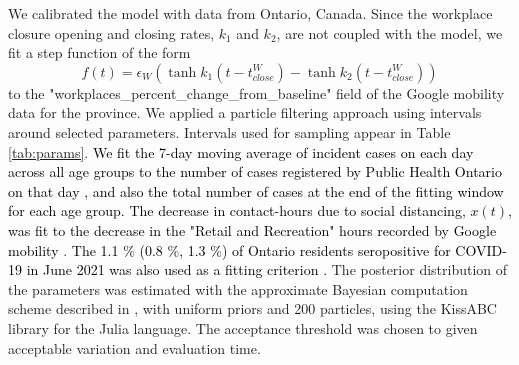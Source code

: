 We calibrated the model with data from Ontario, Canada. Since the workplace closure opening and closing rates, $k_1$ and $k_2$, are not coupled with the model, we fit a step function of the form $$f(t) = \epsilon_W \left( \tanh{k_1(t - t^W_{close})} - \tanh{k_2(t - t^W_{close})}\right)$$ to the \textrm{"workplaces\_percent\_change\_from\_baseline"} field of the Google mobility data \cite{googlemobility} for the province. We applied a particle filtering approach using intervals around selected parameters. Intervals used for sampling appear in Table \ref{tab:params}. \textcolor{black}{We fit the 7-day moving average of incident cases on each day across all age groups to the number of cases registered by Public Health Ontario on that day \cite{ontariocoviddata}, and also the total number of cases at the end of the fitting window for each age group. The decrease in contact-hours due to social distancing, $x(t)$, was fit to the decrease in the "Retail and Recreation" hours recorded by Google mobility \cite{googlemobility}}.  \textcolor{black}{The 1.1 $\%$ (0.8 $\%$, 1.3 $\%$)  of Ontario residents seropositive for COVID-19 in June 2021 was also used as a fitting criterion \cite{ontario_sero}.} The posterior distribution of the parameters was estimated with the approximate Bayesian computation scheme described in \cite{turner2012approximate}, with uniform priors and 200 particles, using the KissABC \cite{kissabc} library for the Julia language. The acceptance threshold was chosen to given acceptable variation and evaluation time.


